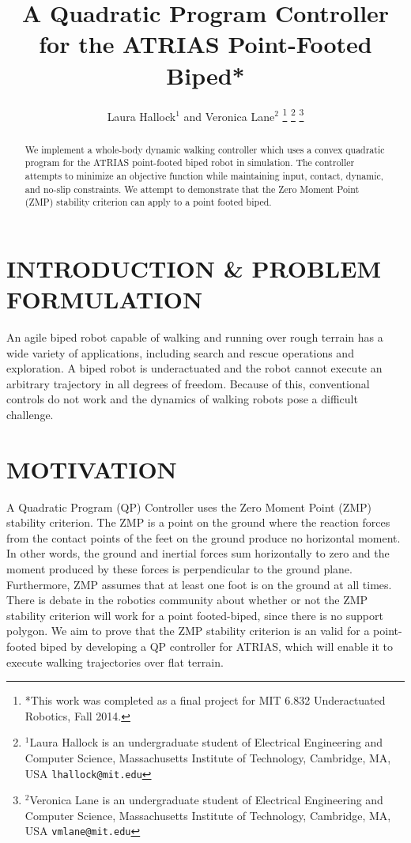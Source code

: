\documentclass[letterpaper, 10 pt, conference]{ieeeconf}  %
\title{\LARGE \bf
A Quadratic Program Controller for the ATRIAS Point-Footed Biped*
}
\author{Laura Hallock$^{1}$ and Veronica Lane$^{2}$%
\thanks{*This work was completed as a final project for MIT 6.832 Underactuated Robotics, Fall 2014.}%
\thanks{$^{1}$Laura Hallock is an undergraduate student of Electrical Engineering and Computer Science,
        Massachusetts Institute of Technology, Cambridge, MA, USA
        {\tt\small lhallock@mit.edu}}%
\thanks{$^{2}$Veronica Lane is an undergraduate student of Electrical Engineering and Computer Science,
        Massachusetts Institute of Technology, Cambridge, MA, USA
        {\tt\small vmlane@mit.edu}}%
}
\begin{document}
\maketitle
\thispagestyle{empty}
\pagestyle{empty}


\begin{abstract}

We implement a whole-body dynamic walking controller which uses a convex quadratic program for the ATRIAS point-footed biped robot in simulation. The controller attempts to minimize an objective function while maintaining input, contact, dynamic, and no-slip constraints. We attempt to demonstrate that the Zero Moment Point (ZMP) stability criterion can apply to a point footed biped.

\end{abstract}


\section{INTRODUCTION \& PROBLEM FORMULATION}

An agile biped robot capable of walking and running over rough terrain has a wide variety of applications, including search and rescue operations and exploration. A biped robot is underactuated and the robot cannot execute an arbitrary trajectory in all degrees of freedom. Because of this, conventional controls do not work and the dynamics of walking robots pose a difficult challenge.

\section{MOTIVATION}

A Quadratic Program (QP) Controller uses the Zero Moment Point (ZMP) stability criterion.  The ZMP is a point on the ground where the reaction forces from the contact points of the feet on the ground produce no horizontal moment. In other words, the ground and inertial forces sum horizontally to zero and the moment produced by these forces is perpendicular to the ground plane. Furthermore, ZMP assumes that at least one foot is on the ground at all times. There is debate in the robotics community about whether or not the ZMP stability criterion will work for a point footed-biped, since there is no support polygon. We aim to prove that the ZMP stability criterion is an valid for a point-footed biped by developing a QP controller for ATRIAS, which will enable it to execute walking trajectories over flat terrain.
\end{document}
